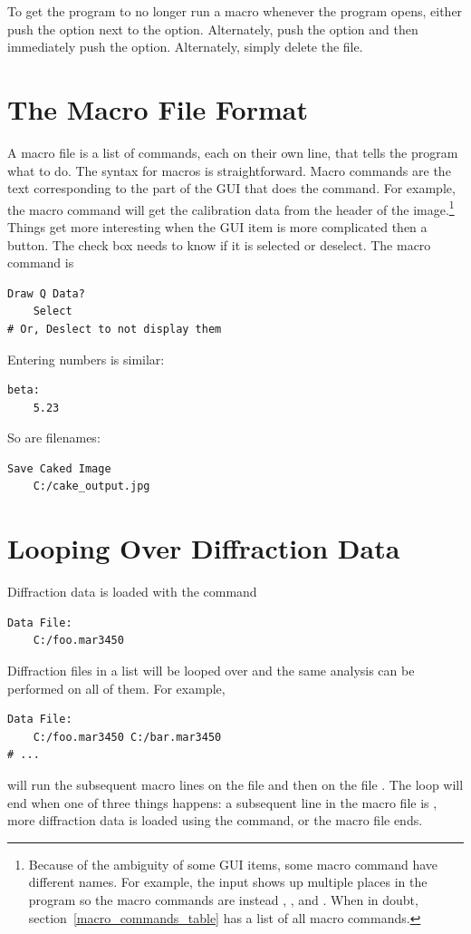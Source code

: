 To get the program to no longer run a macro whenever the program opens,
either push the  option next to the
 option. Alternately, push the
 option and then immediately push the 
 option. Alternately, simply
delete the  file.


\section{The Macro File Format}

A macro file is a list of commands, each on their own line, that tells the 
program what to do.
The syntax for macros is straightforward. Macro commands are the 
text corresponding to the part of the GUI that does 
the command. 
For example, the macro command  
will get the calibration data from the header of the 
image.\footnote{Because of the ambiguity of some GUI items,
some macro command have different names. 
For example, the  input shows up multiple
places in the program so the macro commands are instead
, ,
and . When in doubt, 
section~\ref{macro_commands_table} has a list of all macro commands.}
Things get more interesting when the GUI item is more complicated
then a button. The  check box needs to know if it 
is selected or deselect. The macro command is
\begin{lstlisting}
Draw Q Data?
    Select
# Or, Deslect to not display them
\end{lstlisting}
Entering numbers is similar:
\begin{lstlisting}
beta:
    5.23
\end{lstlisting}
So are filenames:
\begin{lstlisting}
Save Caked Image
    C:/cake_output.jpg
\end{lstlisting}

\section{Looping Over Diffraction Data}
\label{LoopOverDiffractionData}

Diffraction data is loaded with the command
\begin{lstlisting}
Data File:
    C:/foo.mar3450
\end{lstlisting}
Diffraction files in a list will be looped over and the same
analysis can be performed on all of them.
For example,
\begin{lstlisting}
Data File:
    C:/foo.mar3450 C:/bar.mar3450 
# ...
\end{lstlisting}
will run the subsequent macro lines on
the file  and
then on the file .
The loop will end when one of three things happens: a subsequent line 
in the macro file is , more diffraction data
is loaded using the  command, or
the macro file ends. 

